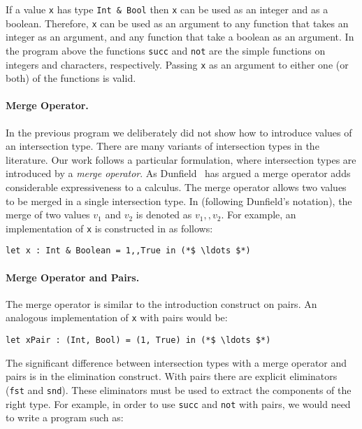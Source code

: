 \noindent If a value \lstinline{x} has type \lstinline{Int & Bool} then
\lstinline{x} can be used as an integer and as a boolean. Therefore,
\lstinline{x} can be used as an argument to any function that takes
an integer as an argument, and any
function that take a boolean as an argument. In the program above
the functions \lstinline{succ} and \lstinline{not} are the
simple functions on integers and characters, respectively.
Passing \lstinline{x} as an argument to either one (or both) of the
functions is valid.

\paragraph{Merge Operator.}
In the previous program we deliberately did not show how to introduce
values of an intersection type. There are many variants of
intersection types in the literature. Our work follows a particular
formulation, where intersection types are introduced by a \emph{merge
  operator}. As Dunfield~\cite{dunfield2014elaborating} has argued a
merge operator adds considerable expressiveness to a calculus. The
merge operator allows two values to be merged in a single intersection
type. In \name (following Dunfield's notation), the merge of two
values $v_1$ and $v_2$ is denoted as $v_1 ,, v_2$.  For example, an
implementation of \lstinline{x} is constructed in \name as follows:

\begin{lstlisting}
let x : Int & Boolean = 1,,True in (*$ \ldots $*)
\end{lstlisting}

\paragraph{Merge Operator and Pairs.}
The merge operator is similar to the introduction construct on pairs.
An analogous implementation of \lstinline{x} with pairs would be:

\begin{lstlisting}
let xPair : (Int, Bool) = (1, True) in (*$ \ldots $*)
\end{lstlisting}

\noindent The significant difference between intersection types with a
merge operator and pairs is in the elimination construct. With pairs
there are explicit eliminators (\lstinline{fst} and
\lstinline{snd}). These eliminators must be used to extract the
components of the right type. For example, in order to use
\lstinline{succ} and \lstinline{not} with pairs, we would need to
write a program such as:

